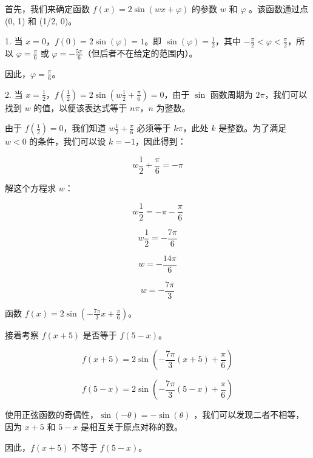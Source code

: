 首先，我们来确定函数 \( f(x) = 2\sin(wx + \varphi) \) 的参数 \( w \) 和 \( \varphi \) 。该函数通过点 (0, 1) 和 (1/2, 0)。

1. 当 \( x = 0 \)，\( f(0) = 2\sin(\varphi) = 1 \)。即 \( \sin(\varphi) = \frac{1}{2} \)，其中 \( -\frac{\pi}{2} < \varphi < \frac{\pi}{2} \)，所以 \( \varphi = \frac{\pi}{6} \) 或 \( \varphi = -\frac{5\pi}{6} \)（但后者不在给定的范围内）。

   因此，\( \varphi = \frac{\pi}{6} \)。

2. 当 \( x = \frac{1}{2} \)，\( f\left(\frac{1}{2}\right) = 2\sin\left(w\frac{1}{2} + \frac{\pi}{6}\right) = 0 \)，由于 \( \sin \) 函数周期为 \( 2\pi \)，我们可以找到 \( w \) 的值，以便该表达式等于 \( n\pi \)，\( n \) 为整数。

由于 \( f\left(\frac{1}{2}\right) = 0 \)，我们知道 \(w\frac{1}{2} + \frac{\pi}{6}\) 必须等于 \( k\pi \)，此处 \( k \) 是整数。为了满足 \( w < 0 \) 的条件，我们可以设 \( k = -1 \)，因此得到：

\[ w\frac{1}{2} + \frac{\pi}{6} = -\pi \]

解这个方程求 \( w \)：

\[ w\frac{1}{2} = -\pi - \frac{\pi}{6} \]

\[ w\frac{1}{2} = -\frac{7\pi}{6} \]

\[ w = -\frac{14\pi}{6} \]

\[ w = -\frac{7\pi}{3} \]

函数 \( f(x) = 2\sin\left(-\frac{7\pi}{3}x + \frac{\pi}{6}\right) \)。

接着考察 \( f(x+5) \) 是否等于 \( f(5-x) \)。

\[ f(x+5) = 2\sin\left(-\frac{7\pi}{3}(x+5) + \frac{\pi}{6}\right) \]

\[ f(5-x) = 2\sin\left(-\frac{7\pi}{3}(5-x) + \frac{\pi}{6}\right) \]

使用正弦函数的奇偶性，\( \sin(-\theta) = -\sin(\theta) \) ，我们可以发现二者不相等，因为 \( x+5 \) 和 \( 5-x \) 是相互关于原点对称的数。

因此，\( f(x+5) \) 不等于 \( f(5-x) \)。
